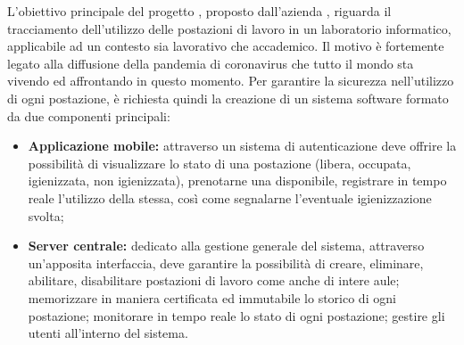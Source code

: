 L'obiettivo principale del progetto \NomeProgetto{}, proposto dall'azienda \proponente{}, riguarda il tracciamento dell'utilizzo delle postazioni di lavoro in un laboratorio informatico, applicabile ad un contesto sia lavorativo che accademico.
Il motivo è fortemente legato alla diffusione della pandemia di coronavirus che tutto il mondo sta vivendo ed affrontando in questo momento. Per garantire la sicurezza nell'utilizzo di ogni postazione, è richiesta quindi la creazione di un sistema software formato da due componenti principali:
\begin{itemize}
    \item \textbf{Applicazione mobile:} attraverso un sistema di autenticazione deve offrire la possibilità di visualizzare lo stato di una postazione (libera, occupata, igienizzata, non igienizzata), prenotarne una disponibile, registrare in tempo reale l'utilizzo della stessa, così come segnalarne l'eventuale igienizzazione svolta;
    \item \textbf{Server centrale:} dedicato alla gestione generale del sistema, attraverso un'apposita interfaccia, deve garantire la possibilità di creare, eliminare, abilitare, disabilitare postazioni di lavoro come anche di intere aule; memorizzare in maniera certificata ed immutabile lo storico di ogni postazione; monitorare in tempo reale lo stato di ogni postazione; gestire gli utenti all'interno del sistema.
\end{itemize}